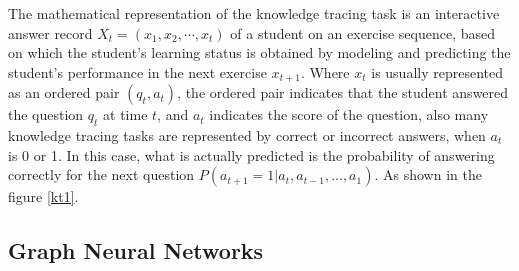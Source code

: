 The mathematical representation of the knowledge tracing task is an interactive answer record $X_t=(x_1,x_2,⋯,x_t)$ of a student on an exercise sequence, based on which the student's learning status is obtained by modeling and predicting the student's performance in the next exercise $x_{t+1}$. Where $x_t$ is usually represented as an ordered pair $(q_t,a_t)$, the ordered pair indicates that the student answered the question $q_t$ at time $t$, and $a_t$ indicates the score of the question, also many knowledge tracing tasks are represented by correct or incorrect answers, when $a_t$ is 0 or 1. In this case, what is actually predicted is the probability of answering correctly for the next question $P(a_{t+1}=1|a_t,a_{t-1},...,a_1)$. As shown in the figure \ref{kt1}.

\subsection{Graph Neural Networks}


